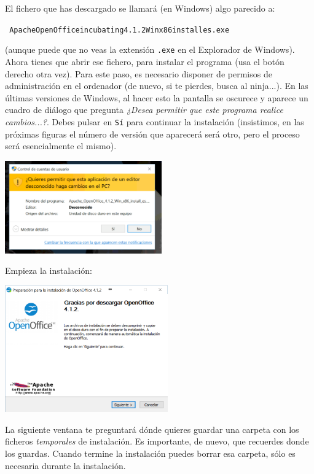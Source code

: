 \documentclass[10pt,a4paper]{article}\usepackage[]{graphicx}\usepackage[]{color}
\newcounter {cont01}
\begin{document}
El fichero que has descargado se llamará (en Windows) algo parecido a:
\begin{center}
{\tt
Apache{\textunderscore}OpenOffice{\textunderscore}incubating{\textunderscore}4.1.2{\textunderscore}Winx{\textunderscore}86{\textunderscore}install{\textunderscore}es.exe}
\end{center}
(aunque puede que no veas la extensión {\tt .exe} en el Explorador de Windows). Ahora tienes que
abrir ese fichero, para instalar el programa (usa el botón derecho otra vez).  Para este paso, es
necesario disponer de permisos de administración en el ordenador (de nuevo, si te pierdes, busca al ninja...). En las últimas versiones de Windows, al hacer esto la pantalla se oscurece y aparece un
cuadro de diálogo que pregunta {\em ¿Desea permitir que este programa realice cambios...?}. Debes
pulsar en {\tt Sí} para continuar la instalación (insistimos, en las próximas figuras el número de
versión que aparecerá será otro, pero el proceso será esencialmente el mismo).
    \begin{center}
    \includegraphics[height=4cm]{../fig/Tut00-OpenOffice-03-201605.png}
    \end{center}
Empieza la instalación:
    \begin{center}
    \includegraphics[width=7cm]{../fig/Tut00-OpenOffice-04-201605.png}
    \end{center}
La siguiente ventana te preguntará dónde quieres guardar una carpeta con los ficheros {\em
temporales} de instalación. Es importante, de nuevo, que recuerdes donde los guardas. Cuando
termine la instalación puedes borrar esa carpeta, sólo es necesaria durante la instalación.
\end{document}
